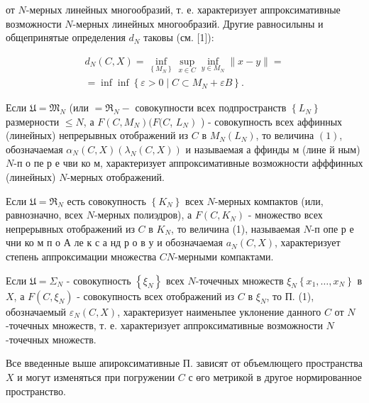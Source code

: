 \documentclass[10pt]{article}
\begin{document}
от $N$-мерных линейных многообразий, т. е. характеризует аппроксимативные возможности $N$-мерных линейных многообразий. Другие равносилыны и общепринятые определения $d_{N}$ таковы (см. [1]):



\[

\begin{gathered}

d_{N}(C, X)=\inf _{\left\{M_{N}\right\}} \sup _{x \in C} \inf _{y \in M_{N}}\|x-y\|= \\

=\inf \inf \left\{\varepsilon>0 \mid C \subset M_{N}+\varepsilon B\right\} .

\end{gathered}

\]



Если $\mathfrak{U}=\mathfrak{M}_{N}$ (или $=\mathfrak{R}_{N}-$ совокупности всех подпространств $\left\{L_{N}\right\}$ размерности $\leqslant N$, а $F\left(C, M_{N}\right)(F(C$, $\left.L_{N}\right)$ ) - совокупность всех аффинных (линейных) непрерывных отображений из $C$ в $M_{N}\left(L_{N}\right)$, то величина $(1)$, обозначаемая $\alpha_{N}(C, X)\left(\lambda_{N}(C, X)\right)$ и называемая а ффинды м (лине й ным) $N$-п о пе р е чви ко м, характеризует аппроксимативные возможности афффинных (линейных) $N$-мерных отображений.



Если $\mathfrak{U}=\mathfrak{\Re}_{N}$ есть совокупность $\left\{K_{N}\right\}$ всех $N$-мерных компактов (или, равнозначно, всех $N$-мерных полиэдров), а $F\left(C, K_{N}\right)$ - множество всех непрерывных отображений из $C$ в $K_{N}$, то величина (1), называемая $N$-п опе р е чни ко м п о А ле к с а нд р о в у и обозначаемая $a_{N}(C, X)$, характеризует степень аппроксимации множества $C N$-мерными компактами.



Если $\mathfrak{U}=\Sigma_{N}$ - совокупность $\left\{\xi_{N}\right\}$ всех $N$-точечных множеств $\xi_{N}\left\{x_{1}, \ldots, x_{N}\right\}$ в $X$, а $F\left(C, \xi_{N}\right)$ - совокупность всех отображений из $C$ в $\xi_{N}$, то П. (1), обозначаемый $\varepsilon_{N}(C, X)$, характеризует наименьпее уклонение данного $C$ от $N$-точечных множеств, т. е. характеризует аппроксимативные возможности $N$-точечных множеств.



Все введенные выше апироксимативные П. зависят от объемлющего пространства $X$ и могут изменяться при погружении $C$ с өго метрикой в другое нормированное пространство.
\end{document}
